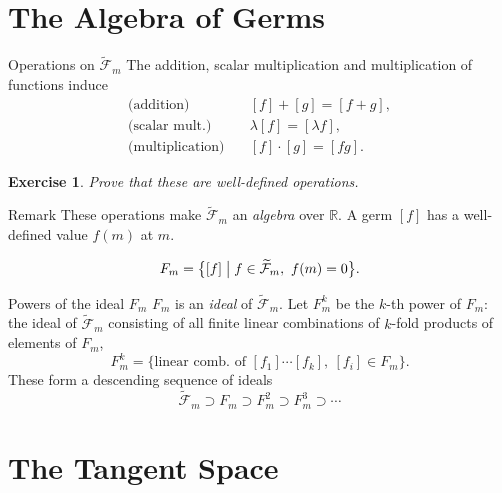 \documentclass[10pt]{beamer}
\newtheorem{exercise}{Exercise}
\newcommand{\R}{\mathbb{R}}
\newcommand{\F}{\mathcal{F}}
\begin{document}
\section{The Algebra of Germs}

\begin{frame}{Operations on $\widetilde{\F}_m$}
	The addition, scalar multiplication and multiplication of functions
	induce
	\begin{align*}
		\text{(addition)}   & \quad [f] + [g] = [f + g], \\
		\text{(scalar mult.)} & \quad \lambda [f] = [\lambda f], \\
		\text{(multiplication)} & \quad [f] \cdot [g] = [fg].
	\end{align*}
	\begin{exercise}
		Prove that these are well-defined operations.
	\end{exercise}
	\begin{block}{Remark}
		These operations make $\widetilde{\F}_m$ an \emph{algebra} over
		$\R$. A germ $[f]$ has a well-defined value $f(m)$ at $m$.
	\end{block}
	\begin{definition}
		\[
			F_m = \bigl\{ [f] \bigm| f \in \widetilde{\F}_m,\ f(m) = 0 \bigr\}.
		\]
	\end{definition}
\end{frame}

\begin{frame}{Powers of the ideal $F_m$}
	$F_m$ is an \emph{ideal} of $\widetilde{\F}_m$. Let $F_m^k$ be the
	$k$-th power of $F_m$: the ideal of $\widetilde{\F}_m$ consisting of
	all finite linear combinations of $k$-fold products of elements of
	$F_m$,
	\[
		F_m^k = \bigl\{ \text{linear comb.\ of } [f_1] \cdots [f_k],
		\ [f_i] \in F_m \bigr\}.
	\]
	These form a descending sequence of ideals
	\[
		\widetilde{\F}_m \supset F_m \supset F_m^2 \supset F_m^3
		\supset \cdots
	\]
\end{frame}

\section{The Tangent Space}
\end{document}
